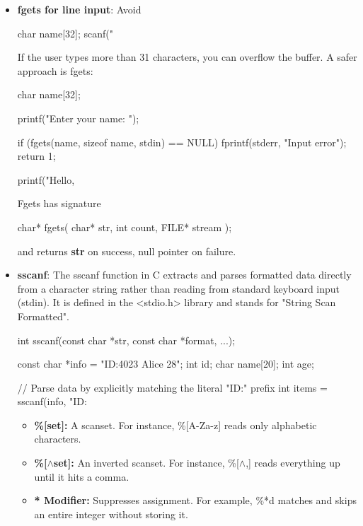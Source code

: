 \documentclass{report}
\begin{document}
\begin{itemize}
            \bigbreak \noindent 
            \begin{cppcode}
            putchar('A');
            \end{cppcode}
        \item \textbf{fgets for line input}:  Avoid
            \bigbreak \noindent 
            \begin{cppcode}
                char name[32];
                scanf("%
            \end{cppcode}
            \bigbreak \noindent 
            If the user types more than 31 characters, you can overflow the buffer. A safer approach is fgets:
            \bigbreak \noindent 
            \begin{cppcode}
                char name[32];

                printf("Enter your name: ");

                if (fgets(name, sizeof name, stdin) == NULL) {
                    fprintf(stderr, "Input error\n");
                    return 1;
                }

                printf("Hello, %
            \end{cppcode}
            \bigbreak \noindent 
            Fgets has signature
            \bigbreak \noindent 
            \begin{cppcode}
            char* fgets( char* str, int count, FILE* stream );
            \end{cppcode}
            \bigbreak \noindent 
            and returns \textbf{str} on success, null pointer on failure.
        \item \textbf{sscanf}: The sscanf function in C extracts and parses formatted data directly from a character string rather than reading from standard keyboard input (stdin). It is defined in the <stdio.h> library and stands for "String Scan Formatted". 
            \bigbreak \noindent 
            \begin{cppcode}
            int sscanf(const char *str, const char *format, ...);
            \end{cppcode}
            \bigbreak \noindent 
            \begin{cppcode}
                const char *info = "ID:4023 Alice 28";
                int id;
                char name[20];
                int age;

                // Parse data by explicitly matching the literal "ID:" prefix
                int items = sscanf(info, "ID:%
            \end{cppcode}
            \begin{itemize}
                \item \textbf{\%[set]:} A scanset. For instance, \%[A-Za-z] reads only alphabetic characters.
                \item \textbf{\%[$\land$set]:} An inverted scanset. For instance, \%[$\land$,] reads everything up until it hits a comma.
                \item \textbf{* Modifier:} Suppresses assignment. For example, \%*d matches and skips an entire integer without storing it.
            \end{itemize}



\end{itemize}
\end{document}
